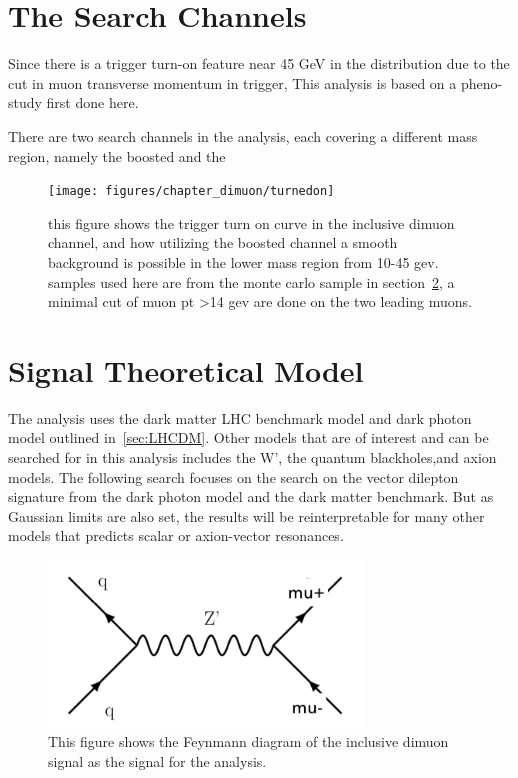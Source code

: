 \section{The Search Channels}
Since there is a trigger turn-on feature near 45 GeV in the distribution due to the cut in muon transverse momentum in trigger, 
This analysis is based on a pheno-study first done here\cite{2014}.

There are two search channels in the analysis, each covering a different mass region, namely the boosted and the 

\begin{figure}[!htb]
    \begin{center}
        \texttt{[image: figures/chapter\_dimuon/turnedon]}
        \caption{
        this figure shows the trigger turn on curve in the inclusive dimuon channel, and how utilizing the boosted channel a smooth background is possible in the lower mass region from 10-45 gev. samples used here are from the monte carlo sample in section~\ref{}, a minimal cut of muon pt >14 gev are done on the two leading muons. }
            \label{fig:turnon}
    \end{center}
\end{figure}

\section{Signal Theoretical Model}

    The analysis uses the dark matter LHC benchmark model and dark photon model outlined in~\ref{sec:LHCDM}.
Other models that are of interest and can be searched for in this analysis includes the W', the quantum blackholes,and axion models. 
The following search focuses on the search on the vector dilepton signature from the dark photon model and the dark matter benchmark. But as Gaussian limits are also set, the results will be reinterpretable for many other models that predicts scalar or axion-vector resonances. 

\begin{figure}[!htb]
    \begin{center}
        \includegraphics[width=0.75\textwidth]{figures/chapter_dimuon/dimuonFeynman}
        \caption{
            This figure shows the Feynmann diagram of the inclusive dimuon signal as the signal for the analysis. }
            \label{fig:dimuonFeynmann}
    \end{center}
\end{figure}


